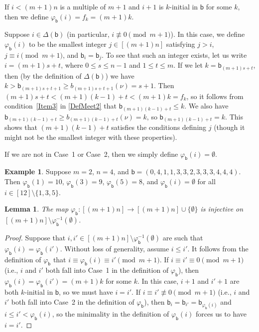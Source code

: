 \documentclass[11pt]{amsart}
\newtheorem{lemma}[theorem]{Lemma}
\theoremstyle{definition}
\newtheorem{example}[theorem]{Example}
\begin{document}
\medskip

 If $i<(m+1)n$ is a multiple of $m+1$ and $i+1$ is $k$-initial in $\mathsf b$ for some $k$, then we define $\varphi_{\mathsf b}(i)=f_k=(m+1)k$. 

\medskip

 Suppose $i\in\Delta(\mathsf b)$ (in particular, $i\not\equiv 0\pmod{m+1}$). In this case, we define $\varphi_{\mathsf b}(i)$ to be the smallest integer $j\in[(m+1)n]$ satisfying $j>i$, $j\equiv i\pmod{m+1}$, and $\mathsf b_i=\mathsf b_{j}$. To see that such an integer exists, let us write $i=(m+1)s+t$, where $0\leq s\leq n-1$ and $1\leq t\leq m$. If we let $k=\mathsf b_{(m+1)s+t}$, then (by the definition of $\Delta(\mathsf b)$) we have $k>\mathsf b_{(m+1)s+t+1}\geq b_{(m+1)s+t+1}(\nu)=s+1$. Then $(m+1)s+t<(m+1)(k-1)+t<(m+1)k=f_k$, so it follows from condition~\eqref{Item3} in \cref{DefMeet2} that $\mathsf b_{(m+1)(k-1)+t}\leq k$. We also have $\mathsf b_{(m+1)(k-1)+t}\geq b_{(m+1)(k-1)+t}(\nu)=k$, so $\mathsf b_{(m+1)(k-1)+t}=k$. This shows that $(m+1)(k-1)+t$ satisfies the conditions defining $j$ (though it might not be the smallest integer with these properties).

\medskip

 If we are not in Case~1 or Case~2, then we simply define $\varphi_{\mathsf b}(i)=\emptyset$. 

\medskip

\begin{example}\label{Exam1}
Suppose $m=2$, $n=4$, and $\mathsf b=(0,4,1,1,3,3,2,3,3,3,4,4,4)$. Then 
$\varphi_{\mathsf b}(1)=10$, $\varphi_{\mathsf b}(3)=9$, $\varphi_{\mathsf b}(5)=8$, and $\varphi_{\mathsf b}(i)=\emptyset$ for all $i\in[12]\setminus\{1,3,5\}$. 
\end{example}

\begin{lemma}\label{lem:injective}
The map $\varphi_{\mathsf b}\colon[(m+1)n]\to[(m+1)n]\cup\{\emptyset\}$ is injective on $[(m+1)n]\setminus\varphi_{\mathsf b}^{-1}(\emptyset)$. 
\end{lemma}

\begin{proof}
Suppose that $i,i'\in[(m+1)n]\setminus\varphi_{\mathsf b}^{-1}(\emptyset)$ are such that $\varphi_{\mathsf b}(i)=\varphi_{\mathsf b}(i')$. Without loss of generality, assume $i\leq i'$. It follows from the definition of $\varphi_{\mathsf b}$ that $i\equiv \varphi_{\mathsf b}(i)\equiv i'\pmod{m+1}$. If $i\equiv i'\equiv 0\pmod{m+1}$ (i.e., $i$ and $i'$ both fall into Case~1 in the definition of $\varphi_{\mathsf b}$), then $\varphi_{\mathsf b}(i)=\varphi_{\mathsf b}(i')=(m+1)k$ for some $k$. In this case, $i+1$ and $i'+1$ are both $k$-initial in $\mathsf b$, so we must have $i=i'$. If $i\equiv i'\not\equiv 0\pmod{m+1}$ (i.e., $i$ and $i'$ both fall into Case~2 in the definition of $\varphi_{\mathsf b}$), then $\mathsf b_{i}=\mathsf b_{i'}=\mathsf b_{\varphi_{\mathsf b}(i)}$ and $i\leq i'<\varphi_{\mathsf b}(i)$, so the minimality in the definition of $\varphi_{\mathsf b}(i)$ forces us to have $i=i'$. 
\end{proof}
\end{document}
